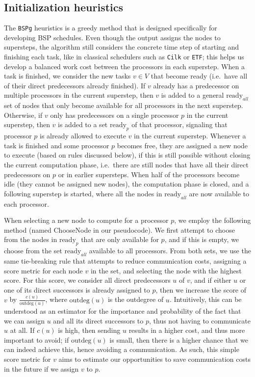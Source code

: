 \documentclass[sigconf,nonacm]{acmart}
\begin{document}
\subsection{Initialization heuristics} The \texttt{BSPg} heuristics is a greedy method that is designed specifically for developing BSP schedules. Even though the output assigns the nodes to supersteps, the algorithm still considers the concrete time step of starting and finishing each task, like in classical schedulers such as \texttt{Cilk} or \texttt{ETF}; this helps us develop a balanced work cost between the processors in each superstep. When a task is finished, we consider the new tasks $v \in V$ that become ready (i.e.\ have all of their direct predecessors already finished). If $v$ already has a predecessor on multiple processors in the current superstep, then $v$ is added to a general $\text{ready}_{all}$ set of nodes that only become available for all processors in the next superstep. Otherwise, if $v$ only has predecessors on a single processor $p$ in the current superstep, then $v$ is added to a set $\text{ready}_p$ of that processor, signaling that processor $p$ is already allowed to execute $v$ in the current superstep. Whenever a task is finished and some processor $p$ becomes free, they are assigned a new node to execute (based on rules discussed below), if this is still possible without closing the current computation phase, i.e.\ there are still nodes that have all their direct predecessors on $p$ or in earlier supersteps. When half of the processors become idle (they cannot be assigned new nodes), the computation phase is closed, and a following superstep is started, where all the nodes in $\text{ready}_{all}$ are now available to each processor.

When selecting a new node to compute for a processor $p$, we employ the following method (named ChooseNode in our pseudocode). We first attempt to choose from the nodes in $\text{ready}_p$ that are only available for $p$, and if this is empty, we choose from the set $\text{ready}_{all}$ available to all processors. From both sets, we use the same tie-breaking rule that attempts to reduce communication costs, assigning a score metric for each node $v$ in the set, and selecting the node with the highest score. For this score, we consider all direct predecessors $u$ of $v$, and if either $u$ or one of its direct successors is already assigned to $p$, then we increase the score of $v$ by $\frac{c(u)}{\text{outdeg}(u)}$, where $\text{outdeg}(u)$ is the outdegree of $u$. Intuitively, this can be understood as an estimator for the importance and probability of the fact that we can assign $u$ and all its direct successors to $p$, thus not having to communicate $u$ at all. If $c(u)$ is high, then sending $u$ results in a higher cost, and thus more important to avoid; if $\text{outdeg}(u)$ is small, then there is a higher chance that we can indeed achieve this, hence avoiding a communication. As such, this simple score metric for $v$ aims to estimate our opportunities to save communication costs in the future if we assign $v$ to $p$.
\end{document}
